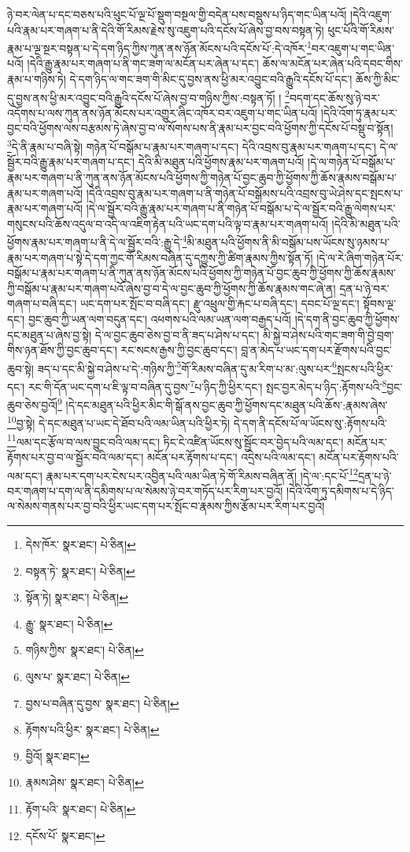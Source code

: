 ཉེ་བར་ལེན་པ་དང་བཅས་པའི་ཕུང་པོ་ལྔ་པོ་སྡུག་བསྔལ་གྱི་བདེན་པས་བསྡུས་པ་ཉིད་གང་ཡིན་པའོ། །དེའི་འཇུག་པའི་རྣམ་པར་གཞག་པ་ནི་དེའི་གོ་རིམས་རྗེས་སུ་འཇུག་པའི་དངོས་པོ་ཞེས་བྱ་བས་བསྟན་ཏེ། ཕུང་པོའི་གོ་རིམས་རྣམ་པ་ལྔ་སྔར་བསྟན་པ་དེ་དག་ཉིད་ཀྱིས་ཀུན་ནས་ཉོན་མོངས་པའི་དངོས་པོ་:དེ་འཁོར་\footnote{དེས་ཁོར་  སྣར་ཐང་།  པེ་ཅིན། }བར་འཇུག་པ་གང་ཡིན་པའོ། །དེའི་རྒྱུ་རྣམ་པར་གཞག་པ་ནི་གང་ཟག་ལ་མངོན་པར་ཞེན་པ་དང་། ཆོས་ལ་མངོན་པར་ཞེན་པའི་དབང་གིས་རྣམ་པ་གཉིས་ཏེ། དེ་དག་ཉིད་ལ་གང་ཟག་གི་མིང་དུ་བྱས་ནས་ཕྱི་མར་འབྱུང་བའི་རྒྱུའི་དངོས་པོ་དང་། ཆོས་ཀྱི་མིང་དུ་བྱས་ནས་ཕྱི་མར་འབྱུང་བའི་རྒྱུའི་དངོས་པོ་ཞེས་བྱ་བ་གཉིས་ཀྱིས་:བསྟན་ཏོ། །
\footnote{བསྟན་ཏེ་  སྣར་ཐང་།  པེ་ཅིན། }བདག་དང་ཆོས་སུ་ཉེ་བར་འདོགས་པ་ལས་ཀུན་ནས་ཉོན་མོངས་པར་འགྱུར་ཞིང་འཁོར་བར་འཇུག་པ་གང་ཡིན་པའོ། །དེའི་འོག་ཏུ་རྣམ་པར་བྱང་བའི་ཕྱོགས་ལས་བརྩམས་ཏེ་ཞེས་བྱ་བ་ལ་སོགས་པས་ནི་རྣམ་པར་བྱང་བའི་ཕྱོགས་ཀྱི་དངོས་པོ་བསྡུ་བ་སྟོན།\footnote{སྟོན་ཏེ།  སྣར་ཐང་།  པེ་ཅིན། }དེ་ནི་རྣམ་པ་བཞི་སྟེ། གཉེན་པོ་བསྒོམ་པ་རྣམ་པར་གཞག་པ་དང་། དེའི་འབྲས་བུ་རྣམ་པར་གཞག་པ་དང་། དེ་ལ་སྦྱོར་བའི་རྒྱུ་རྣམ་པར་གཞག་པ་དང་། དེའི་མི་མཐུན་པའི་ཕྱོགས་རྣམ་པར་གཞག་པའོ། །དེ་ལ་གཉེན་པོ་བསྒོམ་པ་རྣམ་པར་གཞག་པ་ནི་ཀུན་ནས་ཉོན་མོངས་པའི་ཕྱོགས་ཀྱི་གཉེན་པོ་བྱང་ཆུབ་ཀྱི་ཕྱོགས་ཀྱི་ཆོས་རྣམས་བསྒོམ་པ་རྣམ་པར་གཞག་པའོ། །དེའི་འབྲས་བུ་རྣམ་པར་གཞག་པ་ནི་གཉེན་པོ་བསྒོམས་པའི་འབྲས་བུ་ཡེ་ཤེས་དང་སྤངས་པ་རྣམ་པར་གཞག་པའོ། །དེ་ལ་སྦྱོར་བའི་རྒྱུ་རྣམ་པར་གཞག་པ་ནི་གཉེན་པོ་བསྒོམ་པ་དེ་ལ་སྦྱོར་བའི་རྒྱུ་ལེགས་པར་གསུངས་པའི་ཆོས་འདུལ་བ་འདི་ལ་འཇིག་རྟེན་པའི་ཡང་དག་པའི་ལྟ་བ་རྣམ་པར་གཞག་པའོ། །དེའི་མི་མཐུན་པའི་ཕྱོགས་རྣམ་པར་གཞག་པ་ནི་དེ་ལ་སྦྱོར་བའི་:རྒྱུ་དེ་\footnote{རྒྱུ་  སྣར་ཐང་།  པེ་ཅིན། }མི་མཐུན་པའི་ཕྱོགས་ནི་མི་བསྒོམ་པས་ཡོངས་སུ་ཉམས་པ་རྣམ་པར་གཞག་པ་སྟེ་དེ་དག་ཀྱང་གོ་རིམས་བཞིན་དུ་དཀྱུས་ཀྱི་ཚིག་རྣམས་ཀྱིས་སྟོན་ཏོ། །དེ་ལ་རེ་ཞིག་གཉེན་པོར་བསྒོམ་པ་རྣམ་པར་གཞག་པ་ནི་ཀུན་ནས་ཉོན་མོངས་པའི་ཕྱོགས་ཀྱི་གཉེན་པོ་བྱང་ཆུབ་ཀྱི་ཕྱོགས་ཀྱི་ཆོས་རྣམས་ཀྱི་བསྒོམ་པ་རྣམ་པར་གཞག་པའོ་ཞེས་བྱ་བ་དེ་ལ་བྱང་ཆུབ་ཀྱི་ཕྱོགས་ཀྱི་ཆོས་རྣམས་གང་ཞེ་ན། དྲན་པ་ཉེ་བར་གཞག་པ་བཞི་དང་། ཡང་དག་པར་སྤོང་བ་བཞི་དང་། རྫུ་འཕྲུལ་གྱི་རྐང་པ་བཞི་དང་། དབང་པོ་ལྔ་དང་། སྟོབས་ལྔ་དང་། བྱང་ཆུབ་ཀྱི་ཡན་ལག་བདུན་དང་། འཕགས་པའི་ལམ་ཡན་ལག་བརྒྱད་པའོ། །དེ་དག་ནི་བྱང་ཆུབ་ཀྱི་ཕྱོགས་དང་མཐུན་པ་ཞེས་བྱ་སྟེ། དེ་ལ་བྱང་ཆུབ་ཅེས་བྱ་བ་ནི་ཟད་པ་ཤེས་པ་དང་། མི་སྐྱེ་བ་ཤེས་པའི་གང་ཟག་གི་བྱེ་བྲག་གིས་ཉན་ཐོས་ཀྱི་བྱང་ཆུབ་དང་། རང་སངས་རྒྱས་ཀྱི་བྱང་ཆུབ་དང་། བླ་ན་མེད་པ་ཡང་དག་པར་རྫོགས་པའི་བྱང་ཆུབ་སྟེ། ཟད་པ་དང་མི་སྐྱེ་བ་ཤེས་པ་དེ་:གཉིས་ཀྱི་\footnote{གཉིས་ཀྱིས་  སྣར་ཐང་།  པེ་ཅིན། }གོ་རིམས་བཞིན་དུ་མ་རིག་པ་མ་:ལུས་པར་\footnote{ལུས་པ་  སྣར་ཐང་།  པེ་ཅིན། }སྤངས་པའི་ཕྱིར་དང་། རང་གི་དོན་ཡང་དག་པ་ཇི་ལྟ་བ་བཞིན་དུ་བྱས་\footnote{བྱས་པ་བཞིན་དུ་བྱས་  སྣར་ཐང་།  པེ་ཅིན། }པ་ཉིད་ཀྱི་ཕྱིར་དང་། སྤང་བྱར་མེད་པ་ཉིད་:རྟོགས་པའི་\footnote{རྟོགས་པའི་ཕྱིར་  སྣར་ཐང་།  པེ་ཅིན། }བྱང་ཆུབ་ཅེས་བྱའོ།\footnote{བྱིའོ།  སྣར་ཐང་། } །དེ་དང་མཐུན་པའི་ཕྱིར་མིང་གི་སྒོ་ནས་བྱང་ཆུབ་ཀྱི་ཕྱོགས་དང་མཐུན་པའི་ཆོས་:རྣམས་ཞེས་\footnote{རྣམས་ཤེས་  སྣར་ཐང་།  པེ་ཅིན། }བྱ་སྟེ། དེ་དང་མཐུན་པ་ཡང་དེ་ཐོབ་པའི་ལམ་ཡིན་པའི་ཕྱིར་ཏེ། དེ་དག་ནི་དངོས་པོ་ལ་ཡོངས་སུ་:རྟོགས་པའི་\footnote{རྟོག་པའི་  སྣར་ཐང་།  པེ་ཅིན། }ལམ་དང་རྩོལ་བ་ལས་བྱུང་བའི་ལམ་དང་། ཏིང་ངེ་འཛིན་ཡོངས་སུ་སྦྱོང་བར་བྱེད་པའི་ལམ་དང་། མངོན་པར་རྟོགས་པར་བྱ་བ་ལ་སྦྱོར་བའི་ལམ་དང་། མངོན་པར་རྟོགས་པ་དང་། འདྲེས་པའི་ལམ་དང་། མངོན་པར་རྟོགས་པའི་ལམ་དང་། རྣམ་པར་དག་པར་ངེས་པར་འབྱིན་པའི་ལམ་ཡིན་ཏེ་གོ་རིམས་བཞིན་ནོ། །དེ་ལ་:དང་པོ་\footnote{དངོས་པོ་  སྣར་ཐང་། }དྲན་པ་ཉེ་བར་གཞག་པ་དག་ལ་ནི་དམིགས་པ་ལ་སེམས་ཉེ་བར་གཏོད་པར་རིག་པར་བྱའོ། །དེའི་འོག་ཏུ་དམིགས་པ་དེ་ཉིད་ལ་སེམས་གནས་པར་བྱ་བའི་ཕྱིར་ཡང་དག་པར་སྤོང་བ་རྣམས་ཀྱིས་རྩོམ་པར་རིག་པར་བྱའོ། 
